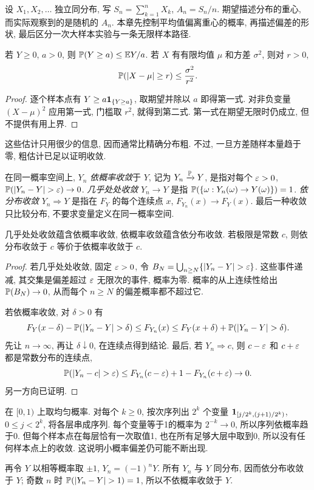 
设 $X_1,X_2,\ldots$ 独立同分布, 写 $S_n=\sum_{k=1}^nX_k$, $A_n=S_n/n$. 期望描述分布的重心, 而实际观察到的是随机的 $A_n$. 本章先控制平均值偏离重心的概率, 再描述偏差的形状, 最后区分一次大样本实验与一条无限样本路径.

\begin{theorem}[Markov与Chebyshev不等式]
若 $Y\geq0$, $a>0$, 则 $\mathbb P(Y\geq a)\leq\mathbb E Y/a$. 若 $X$ 有有限均值 $\mu$ 和方差 $\sigma^2$, 则对 $r>0$,
\[\mathbb P(|X-\mu|\geq r)\leq\frac{\sigma^2}{r^2}.\]
\end{theorem}
\begin{proof}
逐个样本点有 $Y\geq a\mathbf 1_{\{Y\geq a\}}$, 取期望并除以 $a$ 即得第一式. 对非负变量 $(X-\mu)^2$ 应用第一式, 门槛取 $r^2$, 就得到第二式. 第一式在期望无限时仍成立, 但不提供有用上界.
\end{proof}
这些估计只用很少的信息, 因而通常比精确分布粗. 不过, 一旦方差随样本量趋于零, 粗估计已足以证明收敛.

\begin{definition}[三种收敛]
在同一概率空间上, $Y_n$ \emph{依概率收敛}于 $Y$, 记为 $Y_n\xrightarrow{\mathbb P}Y$, 是指对每个 $\varepsilon>0$, $\Prob(|Y_n-Y|>\eps)\to0$. \emph{几乎处处收敛} $Y_n\to Y$ 是指 $\mathbb P(\{\omega:Y_n(\omega)\to Y(\omega)\})=1$. \emph{依分布收敛} $Y_n\Rightarrow Y$ 是指在 $F_Y$ 的每个连续点 $x$, $F_{Y_n}(x)\to F_Y(x)$. 最后一种收敛只比较分布, 不要求变量定义在同一概率空间.
\end{definition}
\begin{proposition}
几乎处处收敛蕴含依概率收敛, 依概率收敛蕴含依分布收敛. 若极限是常数 $c$, 则依分布收敛于 $c$ 等价于依概率收敛于 $c$.
\end{proposition}
\begin{proof}
若几乎处处收敛, 固定 $\varepsilon>0$, 令 $B_N=\bigcup_{n\geq N}\{|Y_n-Y|>\eps\}$. 这些事件递减, 其交集是偏差超过 $\varepsilon$ 无限次的事件, 概率为零. 概率的从上连续性给出 $\mathbb P(B_N)\to0$, 从而每个 $n\geq N$ 的偏差概率都不超过它.

若依概率收敛, 对 $\delta>0$ 有
\[F_Y(x-\delta)-\Prob(|Y_n-Y|>\delta)\leq F_{Y_n}(x)\leq F_Y(x+\delta)+\Prob(|Y_n-Y|>\delta).\]
先让 $n\to\infty$, 再让 $\delta\downarrow0$, 在连续点得到结论. 最后, 若 $Y_n\Rightarrow c$, 则 $c-\varepsilon$ 和 $c+\varepsilon$ 都是常数分布的连续点,
\[\Prob(|Y_n-c|>\eps)\leq F_{Y_n}(c-\eps)+1-F_{Y_n}(c+\eps)\to0.\]
另一方向已证明.
\end{proof}
\begin{example}
在 $[0,1)$ 上取均匀概率. 对每个 $k\geq0$, 按次序列出 $2^k$ 个变量
$\mathbf 1_{[j/2^k,(j+1)/2^k)}$, $0\leq j<2^k$, 将各层串成序列. 每个变量等于1的概率为 $2^{-k}\to0$, 所以序列依概率趋于0. 但每个样本点在每层恰有一次取值1, 也在所有足够大层中取到0, 所以没有任何样本点上的收敛. 这说明小概率偏差仍可能不断出现.

再令 $Y$ 以相等概率取 $\pm1$, $Y_n=(-1)^nY$. 所有 $Y_n$ 与 $Y$ 同分布, 因而依分布收敛于 $Y$; 奇数 $n$ 时 $\Prob(|Y_n-Y|>1)=1$, 所以不依概率收敛于 $Y$.
\end{example}

